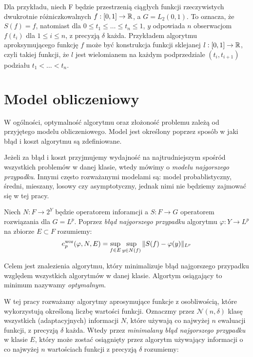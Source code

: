 \documentclass[oik, pdftex, man]{mgrwms}
\begin{document}
    Dla przykładu, niech F będzie przestrzenią ciągłych funkcji rzeczywistych dwukrotnie różniczkowalnych $f: [0,1] \rightarrow \mathbb{R}$, a $G=L_{2}(0,1)$. To oznacza, że $S(f) = f$, natomiast dla $0 \leq t_{1} \leq \ldots \leq t_{n} \leq 1$, $y$ odpowiada $n$ obserwacjom $f(t_{i})$ dla $1 \leq i \leq n$, z precyzją $\delta$ każda. Przykładem algorytmu aproksymującego funkcję $f$ może być konstrukcja funkcji sklejanej $l: [0,1] \rightarrow \mathbb{R}$, czyli takiej funkcji, że $l$ jest wielomianem na każdym podprzedziale $(t_{i}, t_{i+1})$ podziału $t_{1} < \ldots < t_{n}$.




\section{Model obliczeniowy}


    W ogólności, optymalność algorytmu oraz złożoność problemu zależą od przyjętego modelu obliczeniowego. Model jest określony poprzez sposób w jaki błąd i koszt algorytmu są zdefiniowane. 
    
    Jeżeli za błąd i koszt przyjmujemy wydajność na najtrudniejszym spośród wszystkich problemów w danej klasie, wtedy mówimy o \textit{modelu najgorszego przypadku}. Innymi często rozważanymi modelami są: model probablistyczny, średni, mieszany, losowy czy asymptotyczny, jednak nimi nie będziemy zajmować się w tej pracy.

    Niech $N : F \rightarrow 2^{Y}$ będzie operatorem inforamcji a $S: F \rightarrow G$ operatorem rozwiązania dla $G=L^{p}$. Poprzez \textit{błąd najgorszego przypadku} algorytmu $\varphi : Y \rightarrow L^{p}$ na zbiorze $E \subset F$ rozumiemy:
    \begin{equation*}
        e_{p}^{\mathrm{wor}}(\varphi, N, E) = \sup_{f \in E} \sup_{y \in N(f)} \|S(f) - \varphi(y) \|_{L^{p}}
    \end{equation*}

    Celem jest znalezienia algorytmu, który minimalizuje błąd najgorszego przypadku względem wszystkich algorytmów w danej klasie. Algortym osiągający to minimum nazywamy \textit{optymalnym}.

    W tej pracy rozważamy algorytmy aprosymujące funkcje z osobliwością, które wykorzystują określoną liczbę wartości funkcji. Oznaczmy przez $\mathcal{N}(n, \delta)$ klasę wszystkich (adaptacyjnych) informacji $N$, które używają co najwyżej $n$ ewaluacji funkcji, z precyzją $\delta$ każda. Wtedy przez \textit{minimalany błąd najgorszego przypadku} w klasie $E$, który może zostać osiągnięty przez algorytm używający informacji o co najwyżej $n$ wartościach funkcji z precyzją $\delta$ rozumiemy:
\end{document}
